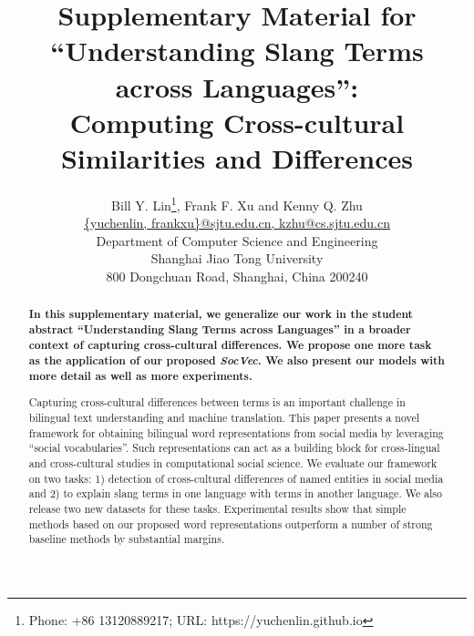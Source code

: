 \documentclass[letterpaper]{article} %
\newcommand{\socvec}{SocVec}
\begin{document}
%
\title{Supplementary Material for 
	``Understanding Slang Terms across Languages'':\\
Computing Cross-cultural Similarities and Differences}
\author{
	Bill Y. Lin\thanks{Phone: +86 13120889217; URL: https://yuchenlin.github.io},
	Frank F. Xu and
	Kenny Q. Zhu
	\\[0.5ex]
	\url{{yuchenlin, frankxu}@sjtu.edu.cn, kzhu@cs.sjtu.edu.cn}\\[0.5ex]
	Department of Computer Science and Engineering\\[0.5ex]
	Shanghai Jiao Tong University\\[0.5ex]
	800 Dongchuan Road, Shanghai, China 200240
}
\maketitle
\begin{abstract}

\textbf{In this supplementary material, we generalize our work in the student abstract ``Understanding Slang Terms across Languages'' in a broader context of capturing cross-cultural differences. 
We propose one more task as the application of our proposed \textit{\socvec}.	We also present our models with more detail as well as more experiments.} 

Capturing cross-cultural differences between terms is an important challenge in bilingual text understanding
and machine translation. 
This paper presents a novel framework for obtaining bilingual
word representations from social media by leveraging ``social vocabularies''. 
Such representations can act as a building block for cross-lingual and cross-cultural studies in computational social science.
We evaluate our framework on two tasks: 
1) detection of cross-cultural differences of named entities in social media
and 
2) to explain slang terms in one language with terms in another language. 
We also release two new datasets for these tasks.
Experimental results show that simple methods based on our proposed word representations outperform a number of strong baseline methods by 
substantial margins.
\end{abstract}
\begin{CJK}{UTF8}{gkai}
	
	
	
	
	 
	
	
	
\end{CJK}
\end{document}

